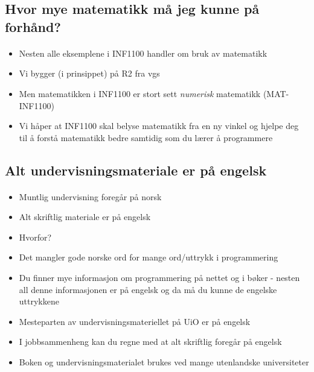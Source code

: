 \documentclass[%
oneside,                 %
final,                   %
10pt]{article}
\begin{document}
\noindent



\subsection*{Hvor mye matematikk må jeg kunne på forhånd?}


\paragraph{}
\begin{itemize}
  \item Nesten alle eksemplene i INF1100 handler om bruk av matematikk

  \item Vi bygger (i prinsippet) på R2 fra vgs

  \item Men matematikken i INF1100 er stort sett \emph{numerisk} matematikk (MAT-INF1100)

  \item Vi håper at INF1100 skal belyse matematikk fra en ny vinkel og hjelpe deg til å forstå matematikk bedre samtidig som du lærer å programmere
\end{itemize}

\noindent



\subsection*{Alt undervisningsmateriale er på engelsk}


\paragraph{}
\begin{itemize}
  \item Muntlig undervisning foregår på norsk

  \item Alt skriftlig materiale er på engelsk

  \item Hvorfor?

  \item Det mangler gode norske ord for mange ord/uttrykk i programmering

  \item Du finner mye informasjon om programmering på nettet og i bøker - nesten all denne informasjonen er på engelsk og da må du kunne de engelske uttrykkene

  \item Mesteparten av undervisningsmateriellet på UiO er på engelsk

  \item I jobbsammenheng kan du regne med at alt skriftlig foregår på engelsk

  \item Boken og undervisningsmaterialet brukes ved mange utenlandske universiteter
\end{itemize}

\noindent




\end{document}
